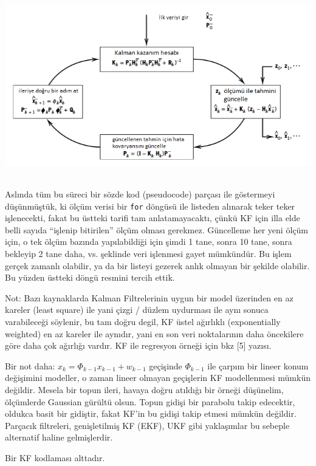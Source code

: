 \documentclass[12pt,fleqn]{article}\usepackage{../../common}
\begin{document}
\includegraphics[height=8cm]{tser_kf_01.png}

Aslında tüm bu süreci bir sözde kod (pseudocode) parçası ile göstermeyi
düşünmüştük, ki ölçüm verisi bir \verb!for! döngüsü ile listeden alınarak teker
teker işlenecekti, fakat bu üstteki tarifi tam anlatamayacaktı, çünkü KF için
illa elde belli sayıda ``işlenip bitirilen'' ölçüm olması gerekmez. Güncelleme
her yeni ölçüm için, o tek ölçüm bazında yapılabildiği için şimdi 1 tane, sonra
10 tane, sonra bekleyip 2 tane daha, vs. şeklinde veri işlenmesi gayet
mümkündür. Bu işlem gerçek zamanlı olabilir, ya da bir listeyi gezerek anlık
olmayan bir şekilde olabilir.  Bu yüzden üstteki döngü resmini tercih ettik.

Not: Bazı kaynaklarda Kalman Filtrelerinin uygun bir model üzerinden en az
kareler (least square) ile yani çizgi / düzlem uydurması ile aynı sonuca
varabileceği söylenir, bu tam doğru degil, KF üstel ağırlıklı
(exponentially weighted) en az kareler ile aynıdır, yani en son veri
noktalarının daha öncekilere göre daha çok ağırlığı vardır. KF ile
regresyon örneği için bkz [5] yazısı.

Bir not daha: $x_k = \Phi_{k-1}x_{k-1} + w_{k-1}$ geçişinde $\Phi_{k-1}$
ile çarpım bir lineer konum değişimini modeller, o zaman lineer olmayan
geçişlerin KF modellenmesi mümkün değildir. Mesela bir topun ileri, havaya
doğru atıldığı bir örneği düşünelim, ölçümlerde Gaussian gürültü
olsun. Topun gidişi bir parabolu takip edecektir, oldukca basit bir
gidiştir, fakat KF'in bu gidişi takip etmesi mümkün değildir. Parçacık
filtreleri, genişletilmiş KF (EKF), UKF gibi yaklaşımlar bu sebeple
alternatif haline gelmişlerdir.

Bir KF kodlaması alttadır. 

\inputminted[fontsize=\footnotesize]{python}{kalman_3d.py}
\end{document}
